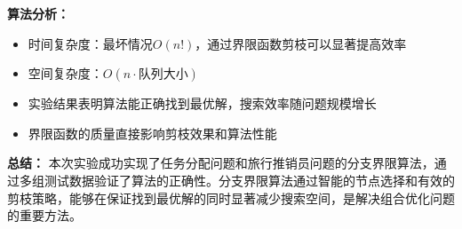 \documentclass[12pt,twoside]{article}
\begin{document}
\begin{problems}
{\bf 算法分析：}
\begin{itemize}
    \item 时间复杂度：最坏情况$O(n!)$，通过界限函数剪枝可以显著提高效率
    \item 空间复杂度：$O(n \cdot \text{队列大小})$
    \item 实验结果表明算法能正确找到最优解，搜索效率随问题规模增长
    \item 界限函数的质量直接影响剪枝效果和算法性能
\end{itemize}

{\bf 总结：}
本次实验成功实现了任务分配问题和旅行推销员问题的分支界限算法，通过多组测试数据验证了算法的正确性。分支界限算法通过智能的节点选择和有效的剪枝策略，能够在保证找到最优解的同时显著减少搜索空间，是解决组合优化问题的重要方法。

\end{problems}
\end{document}
